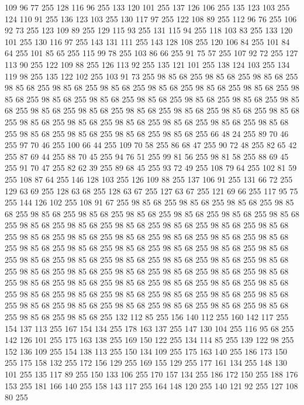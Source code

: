 109 96 77 255 128 116 96 255 133 120 101 255 137 126 106 255 135 123 103 255 124 110 91 255 136 123 103 255 130 117 97 255 122 108 89 255 112 96 76 255 106 92 73 255 123 109 89 255 129 115 93 255 131 115 94 255 118 103 83 255 133 120 101 255 130 116 97 255 143 131 111 255 143 128 108 255 120 106 84 255 101 84 64 255 101 85 65 255 115 99 78 255 103 86 66 255 91 75 57 255 107 92 72 255 127 113 90 255 122 109 88 255 126 113 92 255 135 121 101 255 138 124 103 255 134 119 98 255 135 122 102 255 103 91 73 255 98 85 68 255 98 85 68 255 98 85 68 255 98 85 68 255 98 85 68 255 98 85 68 255 98 85 68 255 98 85 68 255 98 85 68 255 98 85 68 255 98 85 68 255 98 85 68 255 98 85 68 255 98 85 68 255 98 85 68 255 98 85 68 255 98 85 68 255 98 85 68 255 98 85 68 255 98 85 68 255 98 85 68 255 98 85 68 255 98 85 68 255 98 85 68 255 98 85 68 255 98 85 68 255 98 85 68 255 98 85 68 255 98 85 68 255 98 85 68 255
98 85 68 255 98 85 68 255 66 48 24 255 89 70 46 255 97 70 46 255 100 66 44 255 109 70 58 255 86 68 47 255 90 72 48 255 82 65 42 255 87 69 44 255 88 70 45 255 94 76 51 255 99 81 56 255 98 81 58 255 88 69 45 255 91 70 47 255 82 62 39 255 89 68 45 255 93 72 49 255 108 79 64 255 102 81 59 255 108 87 64 255 146 128 103 255 126 109 88 255 137 106 91 255 131 66 72 255 129 63 69 255 128 63 68 255 128 63 67 255 127 63 67 255 121 69 66 255 117 95 75 255 144 126 102 255 108 91 67 255 98 85 68 255 98 85 68 255 98 85 68 255 98 85 68 255 98 85 68 255 98 85 68 255 98 85 68 255 98 85 68 255 98 85 68 255 98 85 68 255 98 85 68 255 98 85 68 255 98 85 68 255 98 85 68 255 98 85 68 255 98 85 68 255 98 85 68 255 98 85 68 255 98 85 68 255 98 85 68 255 98 85 68 255 98 85 68 255 98 85 68 255 98 85 68 255 98 85 68 255 98 85 68 255 98 85 68 255 98 85 68 255 98 85 68 255
98 85 68 255 98 85 68 255 98 85 68 255 98 85 68 255 98 85 68 255 98 85 68 255 98 85 68 255 98 85 68 255 98 85 68 255 98 85 68 255 98 85 68 255 98 85 68 255 98 85 68 255 98 85 68 255 98 85 68 255 98 85 68 255 98 85 68 255 98 85 68 255 98 85 68 255 98 85 68 255 98 85 68 255 98 85 68 255 98 85 68 255 98 85 68 255 98 85 68 255 98 85 68 255 98 85 68 255 98 85 68 255 98 85 68 255 98 85 68 255 98 85 68 255 132 112 85 255 156 140 112 255 160 142 117 255 154 137 113 255 167 154 134 255 178 163 137 255 147 130 104 255 116 95 68 255 142 126 101 255 175 163 138 255 169 150 122 255 134 114 85 255 139 122 98 255 152 136 109 255 154 138 113 255 150 134 109 255 175 163 140 255 186 173 150 255 175 158 132 255 172 156 129 255 169 155 129 255 177 161 134 255 148 130 101 255 135 117 89 255 150 133 106 255 170 157 134 255 186 172 150 255 188 176 153 255 181 166 140 255 158 143 117 255 164 148 120 255 140 121 92 255 127 108 80 255
